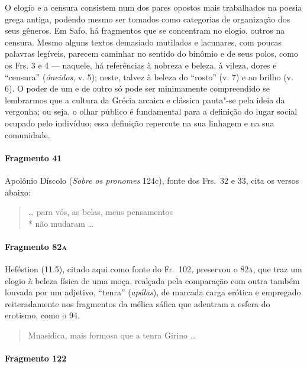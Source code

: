 {O elogio e a censura consistem num dos pares opostos mais trabalhados na poesia
grega antiga, podendo mesmo ser tomados como categorias de organização dos seus gêneros.
Em Safo, há fragmentos que se concentram no
elogio, outros na
censura. Mesmo alguns textos demasiado mutilados e lacunares, com poucas palavras legíveis, parecem caminhar no sentido do binômio e de seus polos, como os Frs. 3 e 4 --- naquele, há referências à nobreza e beleza, à vileza, dores e ``censura'' (\textit{óneidos}, v. 5); neste, talvez à beleza do ``rosto'' (v. 7) e ao brilho (v. 6). O poder de um e de outro só pode ser
minimamente compreendido se lembrarmos que a cultura da Grécia arcaica e
clássica pauta"-se pela ideia da vergonha; ou seja, o olhar público é
fundamental para a definição do lugar social ocupado pelo indivíduo; essa
definição repercute na sua linhagem e na sua comunidade. 

\paragraph{Fragmento 41}

{\small Apolônio Díscolo (\textit{Sobre os pronomes} 124c), fonte dos Frs.~32 e 33, cita os versos abaixo:}

\begin{verse}
\ldots{} para vós, as belas, meus pensamentos\\*
não mudaram \ldots{}
\end{verse}

\paragraph{Fragmento 82\textsc{a}}

{\small Heféstion (11.5), citado aqui como fonte do Fr.~102, preservou o 82\textsc{a}, que traz
um elogio à beleza física de uma moça, realçada pela comparação com outra
também louvada por um adjetivo, ``tenra” (\textit{apálas}), de marcada
carga erótica e empregado reiteradamente nos fragmentos da mélica sáfica que
adentram a esfera do erotismo, como o 94.}

\begin{verse}
Mnasidica, mais formosa que a tenra Girino \ldots{}
\end{verse}


\paragraph{Fragmento 122}

}
